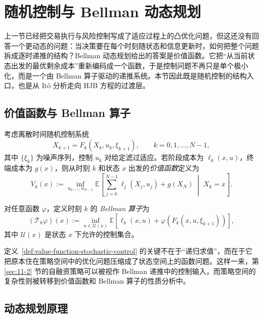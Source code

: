 \section{随机控制与 Bellman 动态规划}

\label{sec:11-3}

上一节已经把交易执行与风险控制写成了适应过程上的凸优化问题，但这还没有回答一个更动态的问题：当决策要在每个时刻随状态和信息更新时，如何把整个问题拆成逐时递推的结构？Bellman 动态规划给出的答案是价值函数。它把“从当前状态出发的最优剩余成本”重新编码成一个函数，于是控制问题不再只是单个极小化，而是一个由 Bellman 算子驱动的递推系统。本节因此既是随机控制的结构入口，也是从 It\^o 分析走向 HJB 方程的过渡层。

\subsection{价值函数与 Bellman 算子}

\begin{definition}[随机控制的价值函数]\label{def:value-function-stochastic-control}
考虑离散时间随机控制系统
\[
X_{k+1}=F_k(X_k,u_k,\xi_{k+1}),
\qquad k=0,1,\dots,N-1,
\]
其中 $\{\xi_k\}$ 为噪声序列，控制 $u_k$ 对给定滤过适应。若阶段成本为 $\ell_k(x,u)$，终端成本为 $g(x)$，则从时刻 $k$ 和状态 $x$ 出发的\emph{价值函数}定义为
\[
V_k(x)
:=
\inf_{u_k,\dots,u_{N-1}}
\mathbb E\!\left[
\sum_{j=k}^{N-1}\ell_j(X_j,u_j)+g(X_N)
\;\middle|\;
X_k=x
\right].
\]
\end{definition}

\begin{definition}[Bellman 算子]\label{def:bellman-operator}
对任意函数 $\varphi$，定义时刻 $k$ 的 \emph{Bellman 算子}为
\[
(\mathcal T_k\varphi)(x)
:=
\inf_{u\in \mathcal U(x)}
\mathbb E\!\left[
\ell_k(x,u)+\varphi(F_k(x,u,\xi_{k+1}))
\right],
\]
其中 $\mathcal U(x)$ 是状态 $x$ 下允许的控制集合。
\end{definition}

\begin{remark}
定义~\ref{def:value-function-stochastic-control} 的关键不在于“递归求值”，而在于它把原本住在策略空间中的优化问题压缩成了状态空间上的函数问题。这样一来，第 \ref{sec:11-2} 节的自融资策略可以被视作 Bellman 递推中的控制输入，而策略空间的复杂性则被转移到价值函数和 Bellman 算子的性质分析中。
\end{remark}

\subsection{动态规划原理}

